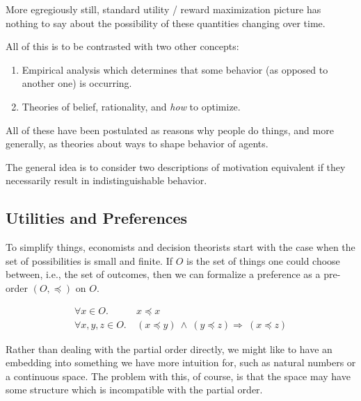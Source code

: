 \documentclass{book}
\begin{document}
	More egregiously still, standard utility / reward maximization picture has nothing to say about the possibility of these quantities changing over time.
	
	
	
	All of this is to be contrasted with two other concepts:

	\begin{enumerate}
		\item Empirical analysis which determines that some behavior (as opposed to another one) is occurring. 
		\item Theories of belief, rationality, and \emph{how} to optimize.
	\end{enumerate}
	
	
	
	All of these have been postulated as reasons why people do things, and more generally, as theories about ways to shape behavior of agents. 
	
	
	
	The general idea is to consider two descriptions of motivation equivalent if they necessarily result in indistinguishable behavior. 
	
	
	\subsection{Utilities and Preferences}
	
	To simplify things, economists and decision theorists start with the case when the set of possibilities is small and finite. If $O$ is the set of things one could choose between, i.e., the set of outcomes, then we can formalize a preference as a pre-order $(O, \preccurlyeq)$ on $O$.
	
	\begin{align*}
		\forall x \in O.&~x \preccurlyeq x \tag{Reflexivity}\\
		\forall x,y,z \in O.&~(x\preccurlyeq y)~\land~( y \preccurlyeq z) \Rightarrow~(x \preccurlyeq z) \tag{Transitivity}
	\end{align*}
	
	Rather than dealing with the partial order directly, we might like to have an embedding into something we have more intuition for, such as natural numbers or a continuous space. The problem with this, of course, is that the space may have some structure which is incompatible with the partial order. 
	
\end{document}
